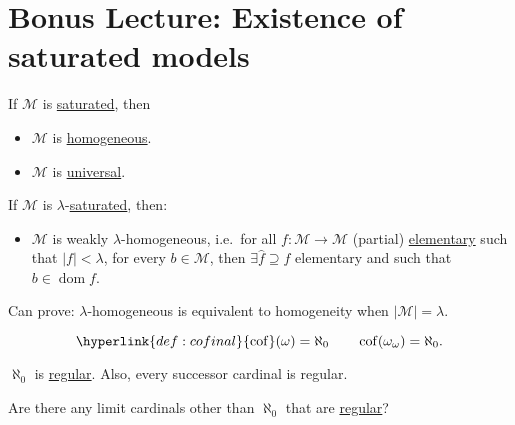 \documentclass{article}
\makeatletter
\DeclareMathOperator{\dom}{dom}
\DeclareMathOperator{\img}{img}
\DeclareMathOperator{\cof}{cof}
\newcommand{\bonusnamed}[1]{\textbf{#1}\index{#1@*#1}}
\newcommand{\M}{\mathcal{M}}
\makeatother
\begin{document}
\section{Bonus Lecture: Existence of saturated models}
If $\mathcal{M}$ is \hyperlink{def:sat}{saturated}, then
\begin{itemize}
  \item $\mathcal{M}$ is \hyperlink{def:homogeneous}{homogeneous}.
  \item $\mathcal{M}$ is \hyperlink{def:univ}{universal}.
\end{itemize}
If $\M$ is $\lambda$-\hyperlink{def:sat}{saturated}, then:
\begin{itemize}
  \item $\M$ is weakly $\lambda$-homogeneous, i.e.\ for all $f:\M \to \M$ (partial) \hyperlink{def:elmap}{elementary} such that $|f| < \lambda$, for every $b \in \M$, then $\exists \hat{f} \supseteq f$ elementary and such that $b \in \dom f$.
\end{itemize}
Can prove: $\lambda$-homogeneous is equivalent to homogeneity when $|\M| = \lambda$.
\begin{eg}
  \begin{equation*}
    \hyperlink{def:cofinal}{\cof}(\omega) = \aleph_0 \qquad \cof(\omega_\omega) = \aleph_0.
  \end{equation*}
\end{eg}
\begin{eg}
  $\aleph_0$ is \hyperlink{def:regular}{regular}.  Also, every successor cardinal is regular.
\end{eg}
Are there any limit cardinals other than $\aleph_0$ that are \hyperlink{def:regular}{regular}?
\end{document}

